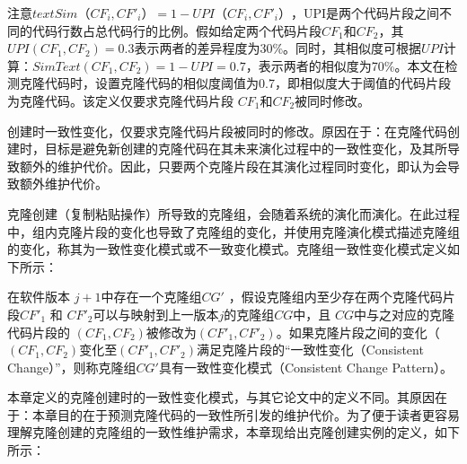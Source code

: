 
注意$\mathit {textSim}（CF_i, CF'_i）= 1 - UPI（CF_i, CF'_i）$，UPI是两个代码片段之间不同的代码行数占总代码行的比例。假如给定两个代码片段$CF_1$和$CF_2$，其$UPI(CF_1,CF_2)=0.3$表示两者的差异程度为30\%。同时，其相似度可根据$UPI$计算：$SimText (CF_1,CF_2)=1-UPI=0.7$，表示两者的相似度为70\%。本文在检测克隆代码时，设置克隆代码的相似度阈值为0.7，即相似度大于阈值的代码片段为克隆代码。该定义仅要求克隆代码片段 $ CF_1 $和$CF_2 $被同时修改。

创建时一致性变化，仅要求克隆代码片段被同时的修改。原因在于：在克隆代码创建时，目标是避免新创建的克隆代码在其未来演化过程中的一致性变化，及其所导致额外的维护代价。因此，只要两个克隆片段在其演化过程同时变化，即认为会导致额外维护代价。

克隆创建（复制粘贴操作）所导致的克隆组，会随着系统的演化而演化。在此过程中，组内克隆片段的变化也导致了克隆组的变化，并使用克隆演化模式描述克隆组的变化，称其为一致性变化模式或不一致变化模式。克隆组一致性变化模式定义如下所示：\\
\begin{definition}
\label{def-cloningpattern}
在软件版本 $j+1$中存在一个克隆组$CG'$ ，假设克隆组内至少存在两个克隆代码片段$CF'_1$ 和 $CF'_2$可以与映射到上一版本$j$的克隆组$CG$中，且 $CG$中与之对应的克隆代码片段的 $(CF_1,CF_2)$被修改为$(CF'_1,CF'_2)$。如果克隆片段之间的变化（ $(CF_1,CF_2)$变化至$(CF'_1,CF'_2)$满足克隆片段的“一致性变化（Consistent Change）”，则称克隆组$CG'$具有一致性变化模式（Consistent Change Pattern）。
\end{definition}


本章定义的克隆创建时的一致性变化模式，与其它论文中的定义不同。其原因在于：本章目的在于预测克隆代码的一致性所引发的维护代价。为了便于读者更容易理解克隆创建的克隆组的一致性维护需求，本章现给出克隆创建实例的定义，如下所示：\\

